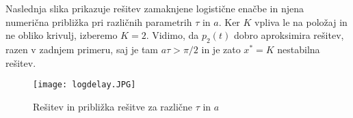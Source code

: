 \documentclass[12pt,a4paper]{amsart}
\theoremstyle{definition} %
\theoremstyle{plain} %
\begin{document}
Naslednja slika prikazuje rešitev zamaknjene logistične enačbe in njena numerična približka pri različnih parametrih 
$\tau$ in $a$. Ker $K$ vpliva le na položaj in ne obliko krivulj, izberemo $K=2$. Vidimo, da $p_2(t)$ dobro aproksimira
rešitev, razen v zadnjem primeru, saj je tam $a\tau>\pi/2$ in je zato $x^*=K$ nestabilna rešitev.
\begin{figure}[h]
    \texttt{[image: logdelay.JPG]}
    \caption{Rešitev in približka rešitve za različne $\tau$ in $a$}
\end{figure}


\newpage
\overfullrule=0mm\printbibliography
\end{document}
